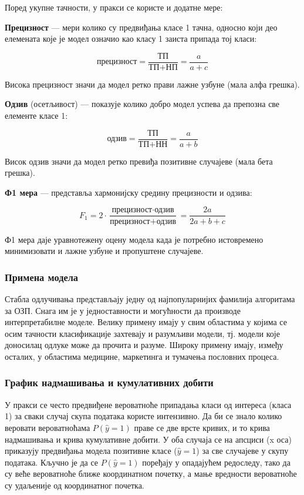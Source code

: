 Поред укупне тачности, у пракси се користе и додатне мере:

\textbf{Прецизност} — мери колико су предвиђања класе 1 тачна, односно који део елемената које је модел означио као класу 1 заиста припада тој класи:

\[
\textrm{прецизност}=\frac{\textrm{ТП}}{\textrm{ТП}+\textrm{НП}}=\frac{a}{a+c}
\]

Висока прецизност значи да модел ретко прави лажне узбуне (мала алфа грешка).

\textbf{Одзив} (осетљивост) — показује колико добро модел успева да препозна све елементе класе 1:

\[
\textrm{одзив}=\frac{\textrm{ТП}}{\textrm{ТП}+\textrm{НН}}=\frac{a}{a+b}
\]

Висок одзив значи да модел ретко превиђа позитивне случајеве (мала бета грешка).

\textbf{Ф1 мера} — представља хармонијску средину прецизности и одзива:

\[
F_{1}=2 \cdot \frac{\textrm{прецизност} \cdot \textrm{одзив}}{\textrm{прецизност}+\textrm{одзив}}=\frac{2a}{2a+b+c}
\]

Ф1 мера даје уравнотежену оцену модела када је потребно истовремено минимизовати и лажне узбуне и пропуштене случајеве.

\subsubsection{Примена модела}
Стабла одлучивања представљају једну од најпопуларнијих фамилија алгоритама за ОЗП. Снага им је у једноставности и могућности да производе интерпретабилне моделе. Велику примену имају у свим областима у којима се осим тачности класификације захтевају и разумљиви модели, тј. модели које доносилац одлуке може да прочита и разуме. Широку примену имају, између осталих, у областима медицине, маркетинга и тумачења пословних процеса.

\subsubsection{График надмашивања и кумулативних добити}
У пракси се често предвиђене вероватноће припадања класи од интереса (класа 1) за сваки случај скупа података користе интензивно. Да би се знало колико веровати вероватноћама $P(\hat{y} = 1)$ праве се две врсте кривих, и то крива надмашивања и крива кумулативне добити. У оба случаја се на апсциси (x оса) приказују предвиђања модела позитивне класе ($\hat{y} = 1$) за све случајеве у скупу података. Кључно је да се $P(\hat{y} = 1)$ поређају у опадајућем редоследу, тако да су веће вероватноће ближе координатном почетку, а мање вредности вероватноће су удаљеније од координатног почетка.


